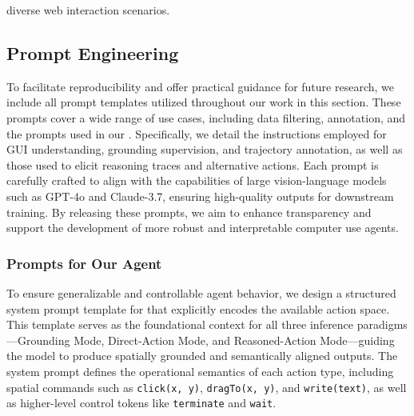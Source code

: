diverse web interaction scenarios.

\subsection{Prompt Engineering}
\label{sec:prompt_template}
To facilitate reproducibility and offer practical guidance for future research, we include all prompt templates utilized throughout our work in this section. These prompts cover a wide range of use cases, including data filtering, annotation, and the prompts used in our \modelname. Specifically, we detail the instructions employed for GUI understanding, grounding supervision, and trajectory annotation, as well as those used to elicit reasoning traces and alternative actions. Each prompt is carefully crafted to align with the capabilities of large vision-language models such as GPT-4o and Claude-3.7, ensuring high-quality outputs for downstream training. By releasing these prompts, we aim to enhance transparency and support the development of more robust and interpretable computer use agents.

\subsubsection{Prompts for Our Agent}
To ensure generalizable and controllable agent behavior, we design a structured system prompt template for \modelname that explicitly encodes the available action space. This template serves as the foundational context for all three inference paradigms—Grounding Mode, Direct-Action Mode, and Reasoned-Action Mode—guiding the model to produce spatially grounded and semantically aligned outputs. The system prompt defines the operational semantics of each action type, including spatial commands such as \texttt{click(x, y)}, \texttt{dragTo(x, y)}, and \texttt{write(text)}, as well as higher-level control tokens like \texttt{terminate} and \texttt{wait}.


